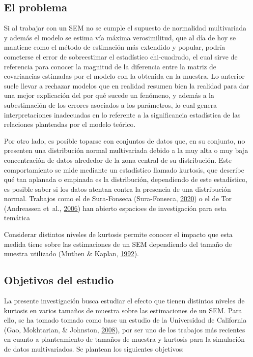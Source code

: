 \documentclass[
]{article}
\begin{document}
\subsection{El problema}

Si al trabajar con un SEM no se cumple el supuesto de normalidad
multivariada y además el modelo se estima vía máxima verosimilitud, que
al día de hoy se mantiene como el método de estimación más extendido y
popular, podría cometerse el error de sobreestimar el estadístico
chi-cuadrado, el cual sirve de referencia para conocer la magnitud de la
diferencia entre la matriz de covariancias estimadas por el modelo con
la obtenida en la muestra. Lo anterior suele llevar a rechazar modelos
que en realidad resumen bien la realidad para dar una mejor explicación
del por qué sucede un fenómeno, y además a la subestimación de los
errores asociados a los parámetros, lo cual genera interpretaciones
inadecuadas en lo referente a la significancia estadística de las
relaciones planteadas por el modelo teórico.

Por otro lado, es posible toparse con conjuntos de datos que, en su
conjunto, no presenten una distribución normal multivariada debido a la
muy alta o muy baja concentración de datos alrededor de la zona central
de su distribución. Este comportamiento se mide mediante un estadístico
llamado kurtosis, que describe qué tan aplanada o empinada es la
distribución, dependiendo de este estadístico, es posible saber si los
datos atentan contra la presencia de una distribución normal. Trabajos
como el de Sura-Fonseca (Sura-Fonseca,
\protect\hyperlink{ref-sura}{2020}) o el de Tor (Andreassen et~al.,
\protect\hyperlink{ref-andreassen}{2006}) han abierto espacioes de
investigación para esta temática

Considerar distintos niveles de kurtosis permite conocer el impacto que
esta medida tiene sobre las estimaciones de un SEM dependiendo del
tamaño de muestra utilizado (Muthen \& Kaplan,
\protect\hyperlink{ref-muthen}{1992}).

\subsection{Objetivos del estudio}

La presente investigación busca estudiar el efecto que tienen distintos
niveles de kurtosis en varios tamaños de muestra sobre las estimaciones
de un SEM. Para ello, se ha tomado tomado como base un estudio de la
Universidad de California (Gao, Mokhtarian, \& Johnston,
\protect\hyperlink{ref-gao}{2008}), por ser uno de los trabajos más
recientes en cuanto a planteamiento de tamaños de muestra y kurtosis
para la simulación de datos multivariados. Se plantean los siguientes
objetivos:
\end{document}
